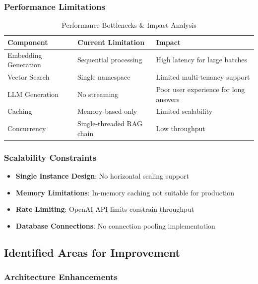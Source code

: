 \documentclass[12pt,a4paper]{article}
\begin{document}
\subsubsection{Performance Limitations}

\begin{table}[H]
\centering
\begin{tabular}{@{}lll@{}}
\toprule
\textbf{Component} & \textbf{Current Limitation} & \textbf{Impact} \\
\midrule
Embedding Generation & Sequential processing & High latency for large batches \\
Vector Search & Single namespace & Limited multi-tenancy support \\
LLM Generation & No streaming & Poor user experience for long answers \\
Caching & Memory-based only & Limited scalability \\
Concurrency & Single-threaded RAG chain & Low throughput \\
\bottomrule
\end{tabular}
\caption{Performance Bottlenecks \& Impact Analysis}
\end{table}

\subsubsection{Scalability Constraints}

\begin{itemize}
    \item \textbf{Single Instance Design}: No horizontal scaling support
    \item \textbf{Memory Limitations}: In-memory caching not suitable for production
    \item \textbf{Rate Limiting}: OpenAI API limits constrain throughput
    \item \textbf{Database Connections}: No connection pooling implementation
\end{itemize}

\subsection{Identified Areas for Improvement}

\subsubsection{Architecture Enhancements}
\end{document}
